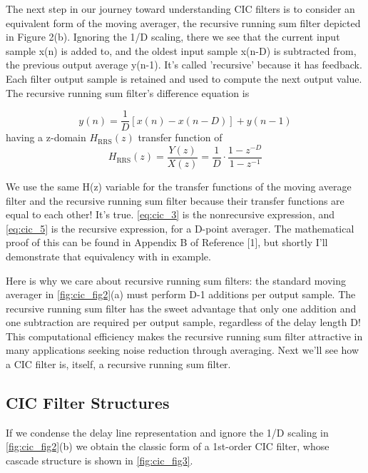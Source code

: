 The next step in our journey toward understanding CIC filters is to consider an equivalent form of the moving averager, the recursive running sum filter depicted in Figure 2(b). Ignoring the 1/D scaling, there we see that the current input sample x(n) is added to, and the oldest input sample x(n-D) is subtracted from, the previous output average y(n-1). It's called 'recursive' because it has feedback. Each filter output sample is retained and used to compute the next output value. The recursive running sum filter's difference equation is

\begin{equation}\label{eq:cic_4}
y(n)=\frac{1}{D}[x(n)-x(n-D)]+y(n-1)
\end{equation}
having a z-domain $H_{\mathrm{RRS}}(z)$ transfer function of 
\begin{equation}\label{eq:cic_5}
H_{\mathrm{RRS}}(z)=\frac{Y(z)}{X(z)}=\frac{1}{D} \cdot \frac{1-z^{-D}}{1-z^{-1}}
\end{equation}

We use the same H(z) variable for the transfer functions of the moving average filter and the recursive running sum filter because their transfer functions are equal to each other! It's true. \autoref{eq:cic_3} is the nonrecursive expression, and \autoref{eq:cic_5} is the recursive expression, for a D-point averager. The mathematical proof of this can be found in Appendix B of Reference [1], but shortly I'll demonstrate that equivalency with in example. 

Here is why we care about recursive running sum filters: the standard moving averager in \autoref{fig:cic_fig2}(a) must perform D-1 additions per output sample. The recursive running sum filter has the sweet advantage that only one addition and one subtraction are required per output sample, regardless of the delay length D! This computational efficiency makes the recursive running sum filter attractive in many applications seeking noise reduction through averaging. Next we'll see how a CIC filter is, itself, a recursive running sum filter. 

\subsection{CIC Filter Structures}
If we condense the delay line representation and ignore the 1/D scaling in \autoref{fig:cic_fig2}(b) we obtain the classic form of a 1st-order CIC filter, whose cascade structure is shown in \autoref{fig:cic_fig3}.

